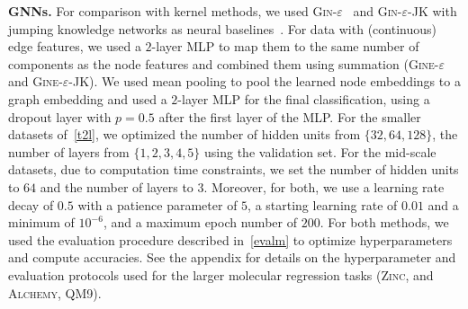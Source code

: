 \documentclass{article}
\newcommand{\xhdr}[1]{{\noindent\bfseries #1}}
\theoremstyle{definition}
\begin{document}
\xhdr{GNNs.} 
For comparison with kernel methods, we used \textsc{Gin-$\varepsilon$}~\cite{Xu+2018b} and \textsc{Gin-$\varepsilon$-JK} with jumping knowledge networks as neural baselines~\cite{Xu+2018}. For data with (continuous) edge features, we used a $2$-layer MLP to map them to the same number of components as the node features and combined them using summation (\textsc{Gine-$\varepsilon$} and \textsc{Gine-$\varepsilon$}-JK). We used mean pooling to pool the learned node embeddings to a graph embedding and used a $2$-layer MLP for the final classification, using a dropout layer with $p = 0.5$ after the first layer of the MLP. For the smaller datasets of~\cref{t2l}, we optimized the number of hidden units from $
\{ 32, 64, 128\}$, the number of layers from $ \{1, 2, 3, 4, 5\}$ using the validation set. For the mid-scale datasets, due to computation time constraints, we set the number of hidden units to $64$ and the number of layers to $3$. Moreover, for both, we use a learning rate decay of $0.5$ with a patience parameter of $5$, a starting learning rate of $0.01$ and a minimum of $10^{-6}$, and a maximum epoch number of $200$. For both methods, we used the evaluation procedure described in~\cref{evalm} to optimize hyperparameters and compute accuracies. See the appendix for details on the hyperparameter and evaluation protocols used for the larger molecular regression tasks (\textsc{Zinc}, and \textsc{Alchemy}, \textsc{QM9}). 
\end{document}
